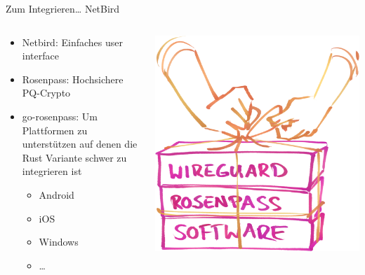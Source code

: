 \documentclass[german]{rosenpass-beamer}
\begin{document}
\begin{frame}{Zum Integrieren… NetBird}
\begin{columns}[c]
\begin{column}{0.7\textwidth}
  \begin{itemize}
    \item Netbird: Einfaches user interface
    \item Rosenpass: Hochsichere PQ-Crypto
    \item
      go-rosenpass: Um Plattformen zu unterstützen auf denen die Rust Variante schwer zu integrieren ist
      \begin{itemize}
        \item Android
        \item iOS
        \item Windows
        \item \dots
      \end{itemize}
  \end{itemize}
\end{column}

\begin{column}{0.2\textwidth}
\includegraphics[width=\linewidth]{graphics/rosenpass in anderen apps.png}


\end{column}
\end{columns}
\end{frame}
\end{document}

